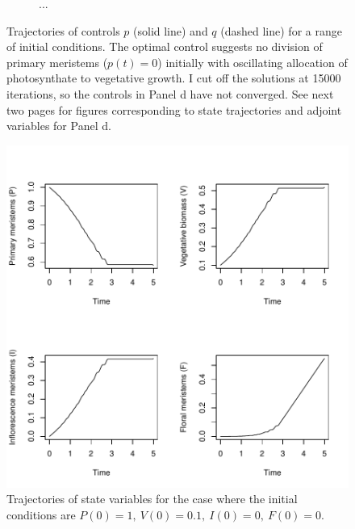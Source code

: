 \documentclass[12pt, oneside]{article}   	%
\begin{document}
\begin{figure}[h]
\begin{subfigure}[t]{0.45\textwidth}
        \caption{...} \label{fig:...}
    \end{subfigure}
        \caption{Trajectories of controls $p$ (solid line) and $q$ (dashed line) for a range of initial conditions. The optimal control suggests no division of primary meristems ($p(t)=0$) initially with oscillating allocation of photosynthate to vegetative growth. I cut off the solutions at 15000 iterations, so the controls in Panel d have not converged. See next two pages for figures corresponding to state trajectories and adjoint variables for Panel d.} \label{fig:...}
\end{figure}

 \begin{figure}[h]
        \centering
       \includegraphics[width=\linewidth]{../../figures/unbranched-determinate-states}  
        \caption{Trajectories of state variables for the case where the initial conditions are $P(0)=1,\ V(0)=0.1,\ I(0)=0,\ F(0)=0$.} \label{fig:...}
\end{figure}
\end{document}
